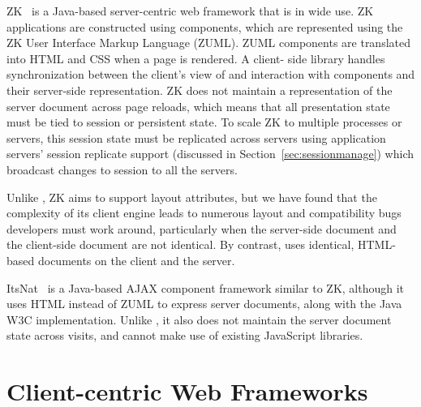 ZK~\cite{ChenCheng:book2007} is a Java-based server-centric web framework that
is in wide use. ZK applications are constructed using components, which are
represented using the ZK User Interface Markup Language (ZUML).  ZUML
components are translated into HTML and CSS when a page is rendered. A client-
side library handles synchronization between the client's  view of and
interaction with components and their server-side  representation.  ZK does
not maintain a representation of the server document across page reloads,
which means that all presentation state must be tied to session or persistent
state. To scale ZK to multiple processes or servers, this session state must
be replicated across servers using application servers' session replicate
support  (discussed in Section~\ref{sec:sessionmanage}) which broadcast
changes to session to all the servers.

Unlike \projectname{}, ZK aims to support layout attributes, but
we have found that the complexity of its client engine leads to 
numerous layout and compatibility bugs developers must work around,
particularly when the server-side document and the client-side
document are not identical.  By contrast, \cb uses identical, HTML-based
documents on the client and the server.

ItsNat~\cite{JoseMariaArranzSantamariaItsNat} is a Java-based AJAX
component framework similar to ZK, although it uses HTML instead of
ZUML to express server documents, along with the Java W3C implementation.  
Unlike \projectname, it also does not maintain the server document 
state across visits, and cannot make use of existing JavaScript libraries.







\section{Client-centric Web Frameworks}

